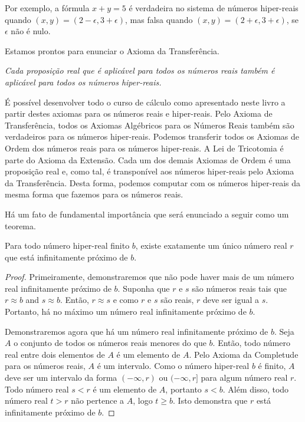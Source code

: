 Por exemplo, a fórmula $x + y = 5$ é verdadeira no sistema de números
hiper-reais quando $(x,y) = (2 - \epsilon, 3 + \epsilon)$, mas falsa
quando $(x,y) = (2+\epsilon, 3 + \epsilon)$, se $\epsilon$ não é nulo.

Estamos prontos para enunciar o Axioma da Transferência.


\emph{Cada proposição real que é aplicável para todos os números reais
também é aplicável para todos os números hiper-reais.}

É possível desenvolver todo o curso de cálculo como apresentado neste
livro a partir destes axiomas para os números reais e hiper-reais. Pelo
Axioma de Transferência, todos os Axiomas Algébricos para os Números
Reais também são verdadeiros para os números hiper-reais. Podemos
transferir todos os Axiomas de Ordem dos números reais para os números
hiper-reais. A Lei de Tricotomia é parte do Axioma da Extensão. Cada um
dos demais Axiomas de Ordem é uma proposição real e, como tal, é
transponível aos números hiper-reais pelo Axioma da Transferência. Desta
forma, podemos computar com os números hiper-reais da mesma forma que
fazemos para os números reais.

Há um fato de fundamental importância que será enunciado a seguir como
um teorema.

\begin{theor}
Para todo número hiper-real finito $b$, existe exatamente um único
número real $r$ que está infinitamente próximo de $b$.
\end{theor}

\begin{proof}
Primeiramente, demonstraremos que não pode haver mais de um número real
infinitamente próximo de $b$. Suponha que $r$ e $s$ são números reais
tais que $r \approx b$ and $s \approx b$. Então, $r \approx s$ e como
$r$ e $s$ são reais, $r$ deve ser igual a $s$. Portanto, há no máximo
um número real infinitamente próximo de $b$.

Demonstraremos agora que há um número real infinitamente próximo de $b$.
Seja $A$ o conjunto de todos os números reais menores do que $b$. Então,
todo número real entre dois elementos de $A$ é um elemento de $A$. Pelo
Axioma da Completude para os números reais, $A$ é um intervalo. Como o
número hiper-real $b$ é finito, $A$ deve ser um intervalo da forma
$(-\infty, r)$ ou $(-\infty, r]$ para algum número real $r$. Todo número
real $s < r$ é um elemento de $A$, portanto $s < b$. Além disso, todo
número real $t > r$ não pertence a $A$, logo $t \ge b$. Isto demonstra
que $r$ está infinitamente próximo de $b$.
\end{proof}

